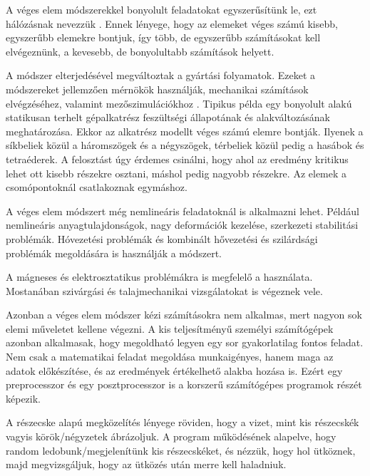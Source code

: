 


A véges elem módszerekkel
bonyolult feladatokat egyszerűsítünk le, ezt hálózásnak nevezzük \cite{veges1}. Ennek lényege, hogy az elemeket véges számú kisebb, egyszerűbb elemekre bontjuk, így több, de egyszerűbb számításokat kell elvégeznünk, a kevesebb, de bonyolultabb számítások helyett.


A módszer elterjedésével megváltoztak a gyártási folyamatok. Ezeket a módszereket jellemzően mérnökök használják, mechanikai számítások elvégzéséhez, valamint mezőszimulációkhoz \cite{wiki}. Tipikus példa egy bonyolult alakú statikusan terhelt gépalkatrész feszültségi állapotának és alakváltozásának meghatározása. Ekkor az alkatrész modellt véges számú elemre bontják. Ilyenek a síkbeliek közül a háromszögek és a négyszögek, térbeliek közül pedig a hasábok és tetraéderek. A felosztást úgy érdemes csinálni, hogy ahol az eredmény kritikus lehet ott kisebb részekre osztani, máshol pedig nagyobb részekre. Az elemek a csomópontoknál csatlakoznak egymáshoz. 


A véges elem módszert még nemlineáris feladatoknál is alkalmazni lehet. Például nemlineáris anyagtulajdonságok, nagy deformációk kezelése, szerkezeti stabilitási problémák. Hóvezetési problémák és kombinált hővezetési és szilárdsági problémák megoldására is használják a módszert. 


A mágneses és elektrosztatikus problémákra is megfelelő a használata. Mostanában szivárgási és talajmechanikai vizsgálatokat is végeznek vele. 

Azonban a véges elem módszer kézi számításokra nem alkalmas, mert nagyon sok elemi műveletet kellene végezni. A kis teljesítményű személyi számítógépek azonban alkalmasak, hogy megoldható legyen egy sor gyakorlatilag fontos feladat. Nem csak a matematikai feladat megoldása munkaigényes, hanem maga az adatok előkészítése, és az eredmények értékelhető alakba hozása is. Ezért egy preprocesszor és egy posztprocesszor is a korszerű számítógépes programok részét képezik.   






A részecske alapú megközelítés lényege röviden, hogy a vizet, mint kis részecskék vagyis körök/négyzetek ábrázoljuk. A program működésének alapelve, hogy random ledobunk/megjelenítünk kis részecskéket, és nézzük, hogy hol ütköznek, majd megvizsgáljuk, hogy az ütközés után merre kell haladniuk. 

